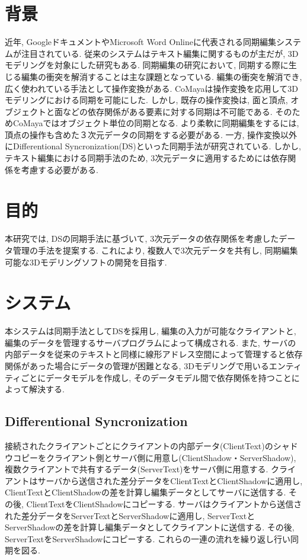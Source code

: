 \documentclass{AIabst}
\begin{document}
\makeAbstHeader
%
%
%
\section{背景}
	近年, GoogleドキュメントやMicrosoft Word Onlineに代表される同期編集システムが注目されている.
	従来のシステムはテキスト編集に関するものが主だが, 3Dモデリングを対象にした研究もある.
	同期編集の研究において, 同期する際に生じる編集の衝突を解消することは主な課題となっている.
	編集の衝突を解消でき, 広く使われている手法として操作変換がある.
	CoMaya\cite{COMAYA}は操作変換を応用して3Dモデリングにおける同期を可能にした.
	しかし, 既存の操作変換は, 面と頂点, オブジェクトと面などの依存関係がある要素に対する同期は不可能である.
	そのためCoMayaではオブジェクト単位の同期となる.
	より柔軟に同期編集をするには, 頂点の操作も含めた３次元データの同期をする必要がある.
	一方, 操作変換以外にDifferentional Syncronization(DS)\cite{DS}といった同期手法が研究されている.
	しかし, テキスト編集における同期手法のため, 3次元データに適用するためには依存関係を考慮する必要がある.

\section{目的}
 本研究では, DSの同期手法に基づいて, 3次元データの依存関係を考慮したデータ管理の手法を提案する.
  これにより, 複数人で3次元データを共有し, 同期編集可能な3Dモデリングソフトの開発を目指す.
\section{システム}
 本システムは同期手法としてDSを採用し, 編集の入力が可能なクライアントと, 編集のデータを管理するサーバプログラムによって構成される.
  また, サーバの内部データを従来のテキストと同様に線形アドレス空間によって管理すると依存関係があった場合にデータの管理が困難となる,
  3Dモデリングで用いるエンティティごとにデータモデルを作成し, そのデータモデル間で依存関係を持つことによって解決する.
  \subsection{Differentional Syncronization}
  接続されたクライアントごとにクライアントの内部データ(ClientText)のシャドウコピーをクライアント側とサーバ側に用意し(ClientShadow・ServerShadow),
  複数クライアントで共有するデータ(ServerText)をサーバ側に用意する.
  クライアントはサーバから送信された差分データをClientTextとClientShadowに適用し, ClientTextとClientShadowの差を計算し編集データとしてサーバに送信する.
  その後, ClientTextをClientShadowにコピーする.
  サーバはクライアントから送信された差分データをServerTextとServerShadowに適用し, ServerTextとServerShadowの差を計算し編集データとしてクライアントに送信する.
  その後, ServerTextをServerShadowにコピーする.
  これらの一連の流れを繰り返し行い同期を図る.
\end{document}

